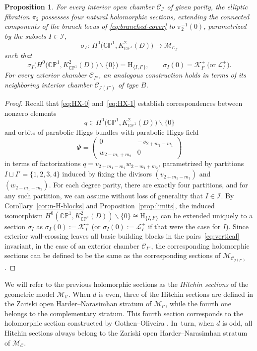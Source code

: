 \documentclass[10pt,a4paper]{amsart}
\newcommand{\field}[1]{\ensuremath{\mathbb{#1}}}
\newcommand{\CC}{\field{C}}
\newcommand{\PP}{\field{P}}
\newcommand{\curly}[1]{\mathscr{#1}}
\newcommand{\cK}{\curly{K}}
\newcommand{\cL}{\curly{L}}
\newcommand{\cM}{\curly{M}}
\newcommand{\qC}{\mathcal{C}}
\newcommand{\qI}{\mathcal{I}}
\numberwithin{equation}{section}
\newtheorem{Proposition}[Theorem]{Proposition}
 { \theoremstyle{definition}
\newtheorem{Definition}[Theorem]{Definition}
\newtheorem{Note}[Theorem]{Note}
\newtheorem{Example}[Theorem]{Example}
\newtheorem{Remark}[Theorem]{Remark} }
\begin{document}
\begin{Proposition}\label{prop:Hitchin-s}
For every interior open chamber $\qC_{\qI}$ of given parity, the elliptic fibration $\pi_{2}$ possesses four natural holomorphic sections, extending the connected components of the branch locus of \eqref{eq:branched-cover} to $\pi^{-1}_{2}(0)$, parametrized by the subsets $I\in \qI$,
\[
\sigma_{I}\colon\ H^{0}\bigl(\CC\PP^{1},K^{2}_{\CC\PP^{1}}(D)\bigr)\rightarrow \cM_{\qC_{\qI}}
\]
such that
\[
\sigma_{I}\bigl(H^{0}\bigl(\CC\PP^{1},K^{2}_{\CC\PP^{1}}(D)\bigr)\backslash \{0\}\bigr) = \mathrm{H}_{\{I,I'\}},\qquad \sigma_{I}(0) = \cK^{+}_{I'}\ \big(\text{or}\ \cL^{+}_{I}\big).
\]
For every exterior chamber $\qC_{I''}$, an analogous construction holds in terms of its neighboring interior chamber $\qC_{\qI(I'')}$ of type $B$.
\end{Proposition}

\begin{proof}
Recall that \eqref{eq:HX-0} and~\eqref{eq:HX-1} establish correspondences between nonzero elements
\[
q\in H^{0}\bigl(\CC\PP^{1},K^{2}_{\CC\PP^{1}}(D)\bigr)\backslash\{0\}
\]
and orbits of parabolic Higgs bundles with parabolic Higgs field
\[
\Phi = \begin{pmatrix}
0 & -v_{2+m_{1}-m_{1}}\\
w_{2-m_{1}+m_{2}} & 0
\end{pmatrix}
\]
in terms of factorizations $q = v_{2+m_{1}-m_{1}}w_{2-m_{1}+m_{2}}$, parametrized by partitions $I\sqcup I' = \{1,2,3,4\}$ induced by fixing the divisors $(v_{2+m_{1}-m_{1}})$ and $(w_{2-m_{1}+m_{2}})$. For each degree parity, there are exactly four partitions, and for any such partition, we can assume without loss of generality that \mbox{$I\in \qI$}. By Corollary~\ref{cor:n-H-blocks} and Proposition~\ref{prop:limits}, the induced isomorphism $H^{0}(\CC\PP^{1},K^{2}_{\CC\PP^{1}}(D))\backslash\{0\}\allowbreak\cong\mathrm{H}_{\{I,I'\}}$ can be extended uniquely to a section $\sigma_{I}$ as $\sigma_{I}(0):= \cK^{+}_{I}$ (or $\sigma_{I}(0):= \cL^{+}_{I}$ if that were the case for $I$). Since exterior wall-crossing leaves all basic building blocks in the pairs~\eqref{eq:vertical} invariant, in the case of an exterior chamber $\qC_{I''}$, the corresponding holomorphic sections can be defined to be the same as the corresponding sections of $\cM_{\qC_{\qI(I'')}}$.
\end{proof}

We will refer to the previous holomorphic sections as the \textit{Hitchin sections} of the geometric model $\cM_{\qC}$. When $d$ is even, three of the Hitchin sections are defined in the Zariski open Harder--Narasimhan stratum of $\cM_{\qC}$, while the fourth one belongs to the complementary stratum. This fourth section corresponds to the holomorphic section constructed by Gothen--Oliveira \cite{GO19}. In~turn, when $d$ is odd, all Hitchin sections always belong to the Zariski open Harder--Narasimhan stratum of $\cM_{\qC}$.
\end{document}
